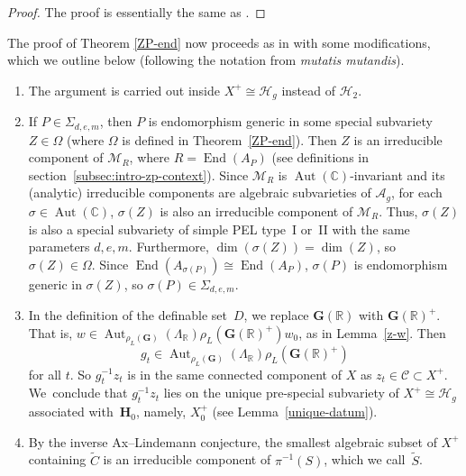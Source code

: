 \documentclass[11pt]{article}
\numberwithin{equation}{section}
\newcommand{\bC}{\mathbb{C}}
\newcommand{\bR}{\mathbb{R}}
\newcommand{\cC}{\mathcal{C}}
\newcommand{\cH}{\mathcal{H}}
\newcommand{\cM}{\mathcal{M}}
\newcommand{\Ag}{\mathcal{A}_g}
\newcommand{\Hg}{\mathcal{H}_g}
\newcommand{\gG}{\mathbf{G}}
\newcommand{\gH}{\mathbf{H}}
\DeclareMathOperator{\Aut}{Aut}
\DeclareMathOperator{\End}{End}
\begin{document}
\begin{proof}
The proof is essentially the same as \cite[Cor.\,6.4]{QRTUI}.
\end{proof}

The proof of Theorem \ref{ZP-end} now proceeds as in
\cite[\S6.5]{QRTUI} with some modifications, which we outline below (following the notation from \cite[\S6.5]{QRTUI} \textit{mutatis mutandis}).
\begin{enumerate}
\item The argument is carried out inside $X^+ \cong \Hg$ instead of $\cH_2$.

\item If $P \in \Sigma_{d,e,m}$, then $P$ is endomorphism generic in some special subvariety $Z \in \Omega$ (where $\Omega$ is defined in Theorem~\ref{ZP-end}).
Then $Z$ is an irreducible component of $\cM_R$, where $R = \End(A_P)$ (see definitions in section~\ref{subsec:intro-zp-context}).
Since $\cM_R$ is $\Aut(\bC)$-invariant and its (analytic) irreducible components are algebraic subvarieties of $\Ag$, for each $\sigma \in \Aut(\bC)$, $\sigma(Z)$ is also an irreducible component of $\cM_R$.
Thus, $\sigma(Z)$ is also a special subvariety of simple PEL type~I or~II with the same parameters $d,e,m$.
Furthermore, $\dim(\sigma(Z)) = \dim(Z)$, so $\sigma(Z) \in \Omega$.
Since $\End(A_{\sigma(P)}) \cong \End(A_P)$, $\sigma(P)$ is endomorphism generic in $\sigma(Z)$, so $\sigma(P) \in \Sigma_{d,e,m}$.

\item In the definition of the definable set~$D$, we replace $\gG(\bR)$ with $\gG(\bR)^+$. That is, $w\in\Aut_{\rho_L(\gG)}(\Lambda_\bR)\rho_L(\gG(\bR)^+)w_0$, as in Lemma~\ref{z-w}. Then
\[g_t \in \Aut_{\rho_L(\gG)}(\Lambda_\bR) \rho_L(\gG(\bR)^+)\] for all $t$. So $g_t^{-1}z_t$ is in the same connected component of $X$ as $z_t \in \cC \subset X^+$. We~conclude that $g_t^{-1}z_t$ lies on the unique pre-special subvariety of $X^+\cong\Hg$ associated with~$\gH_0$, namely, $X^+_0$ (see Lemma~\ref{unique-datum}).

\item By the inverse Ax--Lindemann conjecture, the smallest algebraic subset of $X^+$ containing $\tilde{C}$ is an irreducible component of $\pi^{-1}(S)$, which we call~$\tilde{S}$.


\end{enumerate}
\end{document}
